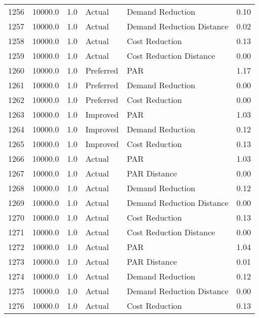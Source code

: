 \begin{longtable}{lrrllr}
1256 &      10000.0 &     1.0 &         Actual &           Demand Reduction &   0.10 \\
1257 &      10000.0 &     1.0 &         Actual &  Demand Reduction Distance &   0.02 \\
1258 &      10000.0 &     1.0 &         Actual &             Cost Reduction &   0.13 \\
1259 &      10000.0 &     1.0 &         Actual &    Cost Reduction Distance &   0.00 \\
1260 &      10000.0 &     1.0 &      Preferred &                        PAR &   1.17 \\
1261 &      10000.0 &     1.0 &      Preferred &           Demand Reduction &   0.00 \\
1262 &      10000.0 &     1.0 &      Preferred &             Cost Reduction &   0.00 \\
1263 &      10000.0 &     1.0 &       Improved &                        PAR &   1.03 \\
1264 &      10000.0 &     1.0 &       Improved &           Demand Reduction &   0.12 \\
1265 &      10000.0 &     1.0 &       Improved &             Cost Reduction &   0.13 \\
1266 &      10000.0 &     1.0 &         Actual &                        PAR &   1.03 \\
1267 &      10000.0 &     1.0 &         Actual &               PAR Distance &   0.00 \\
1268 &      10000.0 &     1.0 &         Actual &           Demand Reduction &   0.12 \\
1269 &      10000.0 &     1.0 &         Actual &  Demand Reduction Distance &   0.00 \\
1270 &      10000.0 &     1.0 &         Actual &             Cost Reduction &   0.13 \\
1271 &      10000.0 &     1.0 &         Actual &    Cost Reduction Distance &   0.00 \\
1272 &      10000.0 &     1.0 &         Actual &                        PAR &   1.04 \\
1273 &      10000.0 &     1.0 &         Actual &               PAR Distance &   0.01 \\
1274 &      10000.0 &     1.0 &         Actual &           Demand Reduction &   0.12 \\
1275 &      10000.0 &     1.0 &         Actual &  Demand Reduction Distance &   0.00 \\
1276 &      10000.0 &     1.0 &         Actual &             Cost Reduction &   0.13 \\

\end{longtable}
